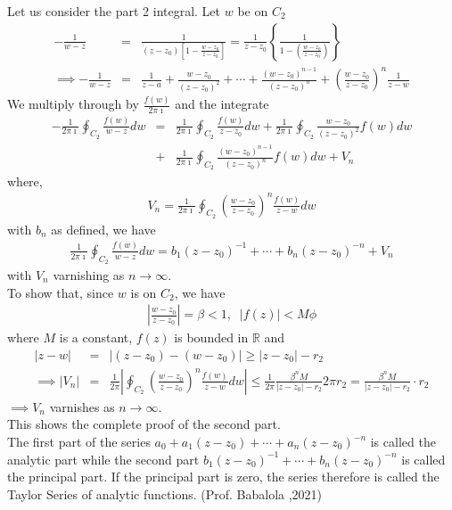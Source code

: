 \documentclass[11pt]{report}
\newcommand{\sps}{\\[0.2cm]}
\newcommand{\dsp}{\displaystyle}
\newcommand{\NI}{\noindent}
\newcommand{\real}{ \mathbb{R}}
\newcommand{\imaginary}{\imath}
\begin{document}
	\NI Let us consider the part 2 integral. Let $w$ be on $C_2$
	\begin{eqnarray*}
		-\frac{1}{w-z} &=& \frac{1}{\left(z-z_0\right)\left[1-\frac{w-z_0}{z-z_0}\right] } = \frac{1}{z-z_0}\left\{\frac{1}{1-\left(\frac{w-z_0}{z-z_0}\right)}\right\}\sps
		\implies -\frac{1}{w-z}&=& \frac{1}{z-a}+ \frac{w-z_0}{(z-z_0)^2} + \cdots + \frac{(w-z_0)^{n-1}}{(z-z_0)^n}+\left( \frac{w-z_0}{z-z_0} \right)^n\frac{1}{z-w}
	\end{eqnarray*}
	We multiply through by $\dsp \frac{f(w)}{2\pi\imaginary}$ and the integrate
	\begin{eqnarray*}
		-\frac{1}{2\pi\imaginary}\oint_{C_2}\frac{f(w)}{w-z}dw &=& \frac{1}{2\pi\imaginary}\oint_{C_2}\frac{f(w)}{z-z_0}dw + \frac{1}{2\pi\imaginary}\oint_{C_2}\frac{w-z_0}{(z-z_0)^2}f(w)dw\sps
		&+&\frac{1}{2\pi\imaginary}\oint_{C_2}\frac{(w-z_0)^{n-1}}{(z-z_0)^n}f(w)dw + V_n
	\end{eqnarray*}
	where,
	\begin{eqnarray*}
		V_n = \frac{1}{2\pi\imaginary}\oint_{C_2}\left( \frac{w-z_0}{z-z_0} \right)^n \frac{f(w)}{z-w}dw
	\end{eqnarray*}
	with $b_n$ as defined, we have
	\begin{eqnarray*}
		\frac{1}{2\pi\imaginary}\oint_{C_2}\frac{f(w)}{w-z}dw = b_1(z-z_0)^{-1} + \cdots + b_n(z-z_0)^{-n} + V_n
	\end{eqnarray*}
	with $V_n$ varnishing as $n\rightarrow\infty$.\\
	To show that, since $w$ is on $C_2$, we have
	\begin{eqnarray*}
		\left| \frac{w-z_0}{z - z_0} \right| = \beta < 1,\;\; |f(z)| < M\phi
	\end{eqnarray*}
	where $M$ is a constant, $f(z)$ is bounded in $\real$ and 
	\begin{eqnarray*}
		|z-w| &=& |(z-z_0) - (w-z_0) | \geq |z-z_0| - r_2\sps
		\implies |V_n| &=&\frac{1}{2\pi}\left| \oint_{C_2}\left( \frac{w-z_0}{z-z_0} \right)^n \frac{f(w)}{z-w} dw \right| \leq \frac{1}{2\pi}\frac{\beta^n M}{|z-z_0|-r_2} 2\pi r_2 = \frac{\beta^n M}{|z-z_0|-r_2} \cdot r_2 
	\end{eqnarray*}
	$\implies V_n$ varnishes as $n\rightarrow\infty$.\\
	This shows the complete proof of the second part.\\
	
	\NI The first part of the series $a_0 + a_1(z-z_0) + \cdots + a_n(z-z_0)^{-n}$ is called the analytic part while the second part $b_1(z-z_0)^{-1} + \cdots + b_n(z-z_0)^{-n}$ is called the principal part. If the principal part is zero, the series therefore is called the Taylor Series of analytic functions.
(Prof. Babalola ,2021)
\end{document}
